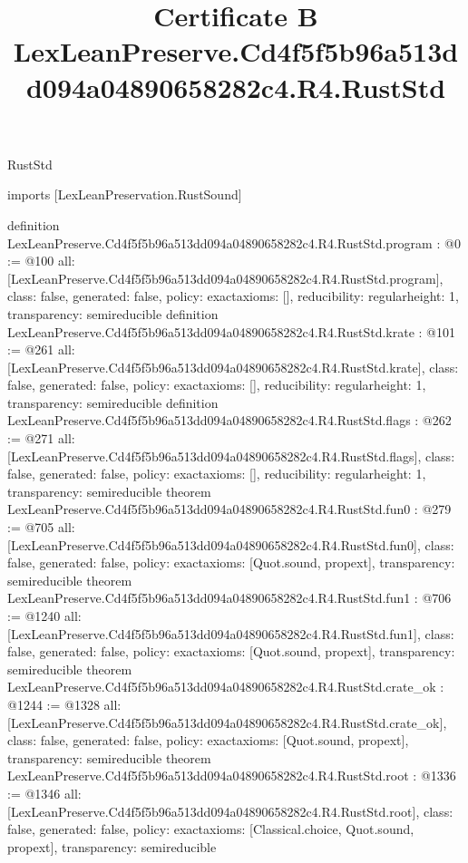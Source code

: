 \begin{lexlean}{RustStd}
\title{Certificate B LexLeanPreserve.Cd4f5f5b96a513dd094a04890658282c4.R4.RustStd}
\begin{coremodule}
imports [LexLeanPreservation.RustSound]

definition LexLeanPreserve.Cd4f5f5b96a513dd094a04890658282c4.R4.RustStd.program : @0 := @100 {
  all: [LexLeanPreserve.Cd4f5f5b96a513dd094a04890658282c4.R4.RustStd.program],
  class: false,
  generated: false,
  policy: exact{axioms: []},
  reducibility: regular{height: 1},
  transparency: semireducible
}
definition LexLeanPreserve.Cd4f5f5b96a513dd094a04890658282c4.R4.RustStd.krate : @101 := @261 {
  all: [LexLeanPreserve.Cd4f5f5b96a513dd094a04890658282c4.R4.RustStd.krate],
  class: false,
  generated: false,
  policy: exact{axioms: []},
  reducibility: regular{height: 1},
  transparency: semireducible
}
definition LexLeanPreserve.Cd4f5f5b96a513dd094a04890658282c4.R4.RustStd.flags : @262 := @271 {
  all: [LexLeanPreserve.Cd4f5f5b96a513dd094a04890658282c4.R4.RustStd.flags],
  class: false,
  generated: false,
  policy: exact{axioms: []},
  reducibility: regular{height: 1},
  transparency: semireducible
}
theorem LexLeanPreserve.Cd4f5f5b96a513dd094a04890658282c4.R4.RustStd.fun0 : @279 := @705 {
  all: [LexLeanPreserve.Cd4f5f5b96a513dd094a04890658282c4.R4.RustStd.fun0],
  class: false,
  generated: false,
  policy: exact{axioms: [Quot.sound, propext]},
  transparency: semireducible
}
theorem LexLeanPreserve.Cd4f5f5b96a513dd094a04890658282c4.R4.RustStd.fun1 : @706 := @1240 {
  all: [LexLeanPreserve.Cd4f5f5b96a513dd094a04890658282c4.R4.RustStd.fun1],
  class: false,
  generated: false,
  policy: exact{axioms: [Quot.sound, propext]},
  transparency: semireducible
}
theorem LexLeanPreserve.Cd4f5f5b96a513dd094a04890658282c4.R4.RustStd.crate_ok : @1244 := @1328 {
  all: [LexLeanPreserve.Cd4f5f5b96a513dd094a04890658282c4.R4.RustStd.crate_ok],
  class: false,
  generated: false,
  policy: exact{axioms: [Quot.sound, propext]},
  transparency: semireducible
}
theorem LexLeanPreserve.Cd4f5f5b96a513dd094a04890658282c4.R4.RustStd.root : @1336 := @1346 {
  all: [LexLeanPreserve.Cd4f5f5b96a513dd094a04890658282c4.R4.RustStd.root],
  class: false,
  generated: false,
  policy: exact{axioms: [Classical.choice, Quot.sound, propext]},
  transparency: semireducible
}


\end{coremodule}
\end{lexlean}
